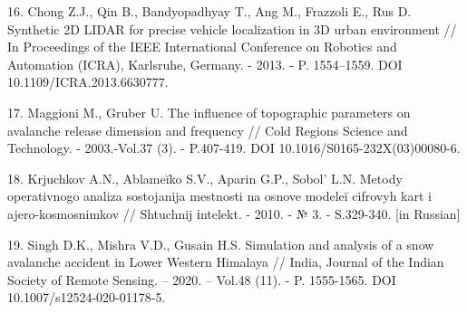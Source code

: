 \begin{references}
16. Chong Z.J., Qin B., Bandyopadhyay T., Ang M., Frazzoli E., Rus D.
Synthetic 2D LIDAR for precise vehicle localization in 3D urban
environment // In Proceedings of the IEEE International Conference on
Robotics and Automation (ICRA), Karlsruhe, Germany. - 2013. - P.
1554--1559. DOI \\10.1109/ICRA.2013.6630777.

17. Maggioni M., Gruber U. The influence of topographic parameters on
avalanche release dimension and frequency // Cold Regions Science and
Technology. - 2003.-Vol.37 (3). - P.407-419. DOI
10.1016/S0165-232X(03)00080-6.

18. Krjuchkov A.N., Ablameĭko S.V., Aparin G.P., Sobol'{}
L.N. Metody operativnogo analiza sostojanija mestnosti na osnove modeleĭ
cifrovyh kart i ajero-kosmosnimkov // Shtuchnij іntelekt. - 2010. - № 3.
- S.329-340. {[}in Russian{]}

19. Singh D.K., Mishra V.D., Gusain H.S. Simulation and analysis of a
snow avalanche accident in Lower Western Himalaya // India, Journal of
the Indian Society of Remote Sensing. -- 2020. -- Vol.48 (11). - P.
1555-1565. DOI 10.1007/s12524-020-01178-5.
\end{references}

